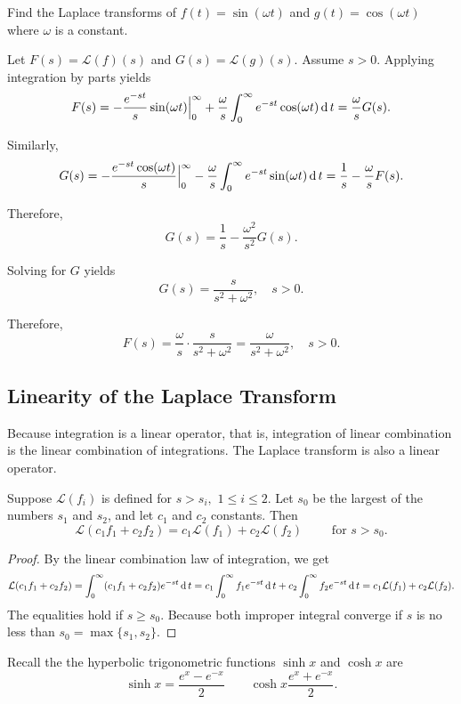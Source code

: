 \begin{exercise}
  Find the Laplace transforms of $f(t)=\sin(\omega t)$ and $g(t)=\cos(\omega t)$ where $\omega$ is a constant.
\end{exercise}
\begin{exersol}
  Let $F(s)=\mathcal{L}(f)(s)$ and $G(s)=\mathcal{L}(g)(s)$.
Assume $s>0$. Applying integration by parts yields
\[
    F(s)=-\frac{e^{-st}}{s}\sin(\omega t)\Big|_0^\infty+\frac{\omega}{s} \int_0^\infty e^{-st}\cos(\omega t)\operatorname{d} t=\frac{\omega}{s}G(s).
\]

Similarly,
\[G(s)=-\frac{e^{-st}\cos(\omega t)}{s}\Big|_0^\infty - \frac{\omega}{s} \int_0^\infty e^{-st}\sin(\omega t)\operatorname{d} t=\frac1s-\frac{\omega}{s}F(s).
\]

Therefore, 
\[G(s)=\frac{1}{s} - \frac{\omega^2}{s^2} G(s).\]

Solving for $G$ yields
\[G(s)=\frac{s}{s^2+\omega^2},\quad s>0.\]

Therefore,
\[F(s)=\frac{\omega}{s}\cdot\frac{s}{s^2+\omega^2}=\frac{\omega}{s^2+\omega^2},\quad s>0.\]
\end{exersol}

\subsection*{Linearity of the Laplace Transform}

Because integration is a linear operator, that is, integration of linear combination is the linear combination of integrations. The Laplace transform is also a linear operator.

\begin{theorem}
    Suppose $\mathcal{L}(f_i)$ is defined for $s>s_i,$ $1\le i\le 2$. Let $s_0$ be the largest of the numbers $s_1$ and $s_{2}$, and let $c_1$ and $c_2$ constants. Then
    \[
      \mathcal{L}(c_1f_1+c_2f_2)=c_1\mathcal{L}(f_1)+c_2\mathcal{L}(f_2)\qquad\text{ for } s>s_0.
    \]
\end{theorem}
\begin{proof}
  By the linear combination law of integration, we get
  \[\mathcal{L}(c_1f_1+c_2f_2)=\int_0^\infty (c_1f_1+c_2f_2)e^{-st}\operatorname{d} t=c_1\int_0^\infty f_1 e^{-st}\operatorname{d} t + c_2\int_0^\infty f_2 e^{-st}\operatorname{d} t=c_1\mathcal{L}(f_1)+c_2\mathcal{L}(f_2).\]
  The equalities hold if $s\ge s_0$. Because both improper integral converge if $s$ is no less than $s_0=\max\{s_1, s_2\}$. 
\end{proof}

Recall the the hyperbolic trigonometric functions $\sinh x$ and $\cosh x$ are
\[\sinh x=\frac{e^x-e^{-x}}{2}\qquad \cosh x \frac{e^x+e^{-x}}{2}.\]

